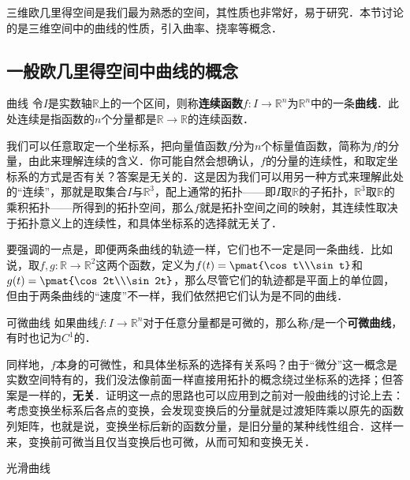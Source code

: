 
三维欧几里得空间是我们最为熟悉的空间，其性质也非常好，易于研究．本节讨论的是三维空间中的曲线的性质，引入曲率、挠率等概念．

\subsection{一般欧几里得空间中曲线的概念}

\begin{definition}{曲线}
令$I$是实数轴$\mathbb{R}$上的一个区间，则称\textbf{连续函数}$f:I\to \mathbb{R}^n$为$\mathbb{R}^n$中的一条\textbf{曲线}．此处连续是指函数的$n$个分量都是$\mathbb{R}\to\mathbb{R}$的连续函数．
\end{definition}

我们可以任意取定一个坐标系，把向量值函数$f$分为$n$个标量值函数，简称为$f$的分量，由此来理解连续的含义．你可能自然会想确认，$f$的分量的连续性，和取定坐标系的方式是否有关？答案是无关的．这是因为我们可以用另一种方式来理解此处的“连续”，那就是取集合$I$与$\mathbb{R}^3$，配上通常的拓扑——即$I$取$\mathbb{R}$的子拓扑，$\mathbb{R}^3$取$\mathbb{R}$的乘积拓扑——所得到的拓扑空间，那么$f$就是拓扑空间之间的映射，其连续性取决于拓扑意义上的连续性，和具体坐标系的选择就无关了．

要强调的一点是，即便两条曲线的轨迹一样，它们也不一定是同一条曲线．比如说，取$f, g:\mathbb{R}\to\mathbb{R}^2$这两个函数，定义为$f(t)=\pmat{\cos t\\\sin t}$和$g(t)=\pmat{\cos 2t\\\sin 2t}$，那么尽管它们的轨迹都是平面上的单位圆，但由于两条曲线的“速度”不一样，我们依然把它们认为是不同的曲线．

\begin{definition}{可微曲线}
如果曲线$f:I\to\mathbb{R}^n$对于任意分量都是可微的，那么称$f$是一个\textbf{可微曲线}，有时也记为$C^1$的．
\end{definition}

同样地，$f$本身的可微性，和具体坐标系的选择有关系吗？由于“微分”这一概念是实数空间特有的，我们没法像前面一样直接用拓扑的概念绕过坐标系的选择；但答案是一样的，\textbf{无关}．证明这一点的思路也可以应用到之前对一般曲线的讨论上去：考虑变换坐标系后各点的变换，会发现变换后的分量就是过渡矩阵乘以原先的函数列矩阵，也就是说，变换坐标后新的函数分量，是旧分量的某种线性组合．这样一来，变换前可微当且仅当变换后也可微，从而可知和变换无关．

\begin{definition}{光滑曲线}

\end{definition}








